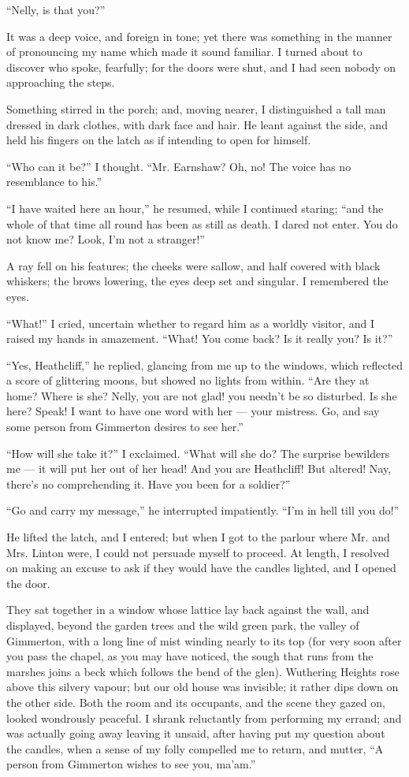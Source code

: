 \par “Nelly, is that you?”
\par It was a deep voice, and foreign in tone; yet there was something in the manner of pronouncing my name which made it sound familiar. I turned about to discover who spoke, fearfully; for the doors were shut, and I had seen nobody on approaching the steps.
\par Something stirred in the porch; and, moving nearer, I distinguished a tall man dressed in dark clothes, with dark face and hair. He leant against the side, and held his fingers on the latch as if intending to open for himself.
\par “Who can it be?” I thought. “Mr. Earnshaw? Oh, no! The voice has no resemblance to his.”
\par “I have waited here an hour,” he resumed, while I continued staring; “and the whole of that time all round has been as still as death. I dared not enter. You do not know me? Look, I'm not a stranger!”
\par A ray fell on his features; the cheeks were sallow, and half covered with black whiskers; the brows lowering, the eyes deep set and singular. I remembered the eyes.
\par “What!” I cried, uncertain whether to regard him as a worldly visitor, and I raised my hands in amazement. “What! You come back? Is it really you? Is it?”
\par “Yes, Heathcliff,” he replied, glancing from me up to the windows, which reflected a score of glittering moons, but showed no lights from within. “Are they at home? Where is she? Nelly, you are not glad! you needn't be so disturbed. Is she here? Speak! I want to have one word with her — your mistress. Go, and say some person from Gimmerton desires to see her.”
\par “How will she take it?” I exclaimed. “What will she do? The surprise bewilders me — it will put her out of her head! And you are Heathcliff! But altered! Nay, there's no comprehending it. Have you been for a soldier?”
\par “Go and carry my message,” he interrupted impatiently. “I'm in hell till you do!”
\par He lifted the latch, and I entered; but when I got to the parlour where Mr. and Mrs. Linton were, I could not persuade myself to proceed. At length, I resolved on making an excuse to ask if they would have the candles lighted, and I opened the door.
\par They sat together in a window whose lattice lay back against the wall, and displayed, beyond the garden trees and the wild green park, the valley of Gimmerton, with a long line of mist winding nearly to its top (for very soon after you pass the chapel, as you may have noticed, the sough that runs from the marshes joins a beck which follows the bend of the glen). Wuthering Heights rose above this silvery vapour; but our old house was invisible; it rather dips down on the other side. Both the room and its occupants, and the scene they gazed on, looked wondrously peaceful. I shrank reluctantly from performing my errand; and was actually going away leaving it unsaid, after having put my question about the candles, when a sense of my folly compelled me to return, and mutter, “A person from Gimmerton wishes to see you, ma'am.”
